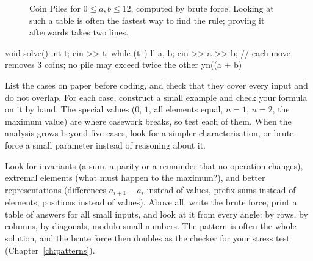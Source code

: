\begin{figure}[htbp]
\centering
{}
\caption{Coin Piles for $0 \le a, b \le 12$, computed by brute force. Looking at such a table is often the fastest way to
find the rule; proving it afterwards takes two lines.}
\label{fig:coinpiles}
\end{figure}

\begin{code}
void solve() {
    int t;
    cin >> t;
    while (t--) {
        ll a, b;
        cin >> a >> b;
        // each move removes 3 coins; no pile may exceed twice the other
        yn((a + b) %
    }
}
\end{code}

\begin{tip}
List the cases on paper before coding, and check that they cover every input and do not overlap. For each case, construct a
small example and check your formula on it by hand. The special values ($0$, $1$, all elements equal, $n = 1$, $n = 2$, the
maximum value) are where casework breaks, so test each of them. When the analysis grows beyond five cases, look for a simpler
characterisation, or brute force a small parameter instead of reasoning about it.
\end{tip}

\begin{trick}
Look for invariants (a sum, a parity or a remainder that no operation changes), extremal elements (what must happen to the
maximum?), and better representations (differences $a_{i+1} - a_i$ instead of values, prefix sums instead of elements,
positions instead of values). Above all, write the brute force, print a table of answers for all small inputs, and look at it
from every angle: by rows, by columns, by diagonals, modulo small numbers. The pattern is often the whole solution, and the
brute force then doubles as the checker for your stress test (Chapter~\ref{ch:patterns}).
\end{trick}

